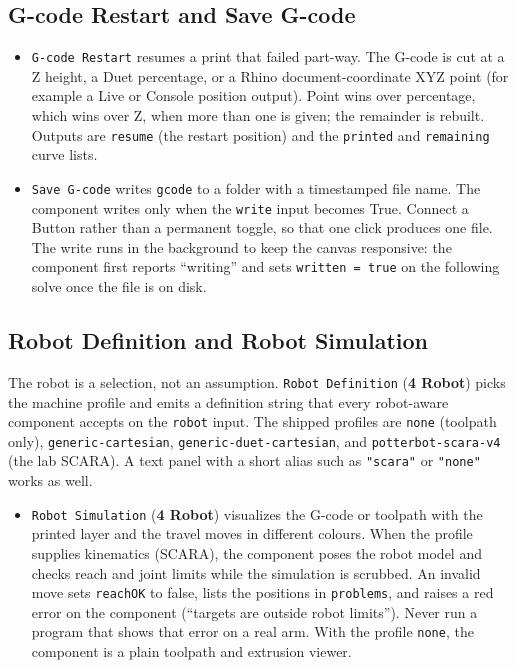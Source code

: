 \documentclass[11pt]{article}
\newcommand{\param}[1]{\texttt{#1}}
\begin{document}
\subsection{G-code Restart and Save G-code}

\begin{itemize}
  \item \param{G-code Restart} resumes a print that failed part-way. The G-code is cut at a Z height, a Duet percentage, or a Rhino document-coordinate XYZ point (for example a Live or Console position output). Point wins over percentage, which wins over Z, when more than one is given; the remainder is rebuilt. Outputs are \param{resume} (the restart position) and the \param{printed} and \param{remaining} curve lists.
  \item \param{Save G-code} writes \param{gcode} to a folder with a timestamped file name. The component writes only when the \param{write} input becomes True. Connect a Button rather than a permanent toggle, so that one click produces one file. The write runs in the background to keep the canvas responsive: the component first reports ``writing'' and sets \param{written = true} on the following solve once the file is on disk.
\end{itemize}

\subsection{Robot Definition and Robot Simulation}

The robot is a selection, not an assumption. \param{Robot
Definition} (\textbf{4 Robot}) picks the machine profile and emits a
definition string that every robot-aware component accepts on the
\param{robot} input. The shipped profiles are \param{none} (toolpath
only), \param{generic-cartesian}, \param{generic-duet-cartesian}, and
\param{potterbot-scara-v4} (the lab SCARA). A text panel with a short
alias such as \texttt{"scara"} or \texttt{"none"} works as well.

\begin{itemize}
  \item \param{Robot Simulation} (\textbf{4 Robot}) visualizes the G-code or toolpath with the printed layer and the travel moves in different colours. When the profile supplies kinematics (SCARA), the component poses the robot model and checks reach and joint limits while the simulation is scrubbed. An invalid move sets \param{reachOK} to false, lists the positions in \param{problems}, and raises a red error on the component (``targets are outside robot limits''). Never run a program that shows that error on a real arm. With the profile \param{none}, the component is a plain toolpath and extrusion viewer.
\end{itemize}
\end{document}
